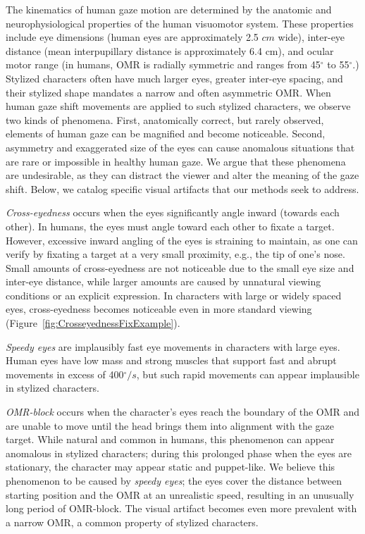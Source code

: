 The kinematics of human gaze motion are determined by the anatomic and neurophysiological properties of the human visuomotor system. These properties include eye dimensions (human eyes are approximately 2.5 $cm$ wide), inter-eye distance (mean interpupillary distance is approximately 6.4 cm), and ocular motor range (in humans, OMR is radially symmetric and ranges from 45$^\circ$ to 55$^\circ$.) Stylized characters often have much larger eyes, greater inter-eye spacing, and their stylized shape mandates a narrow and often asymmetric OMR. When human gaze shift movements are applied to such stylized characters, we observe two kinds of phenomena. First, anatomically correct, but rarely observed, elements of human gaze can be magnified and become noticeable. Second, asymmetry and exaggerated size of the eyes can cause anomalous situations that are rare or impossible in healthy human gaze. We argue that these phenomena are undesirable, as they can distract the viewer and alter the meaning of the gaze shift. Below, we catalog specific visual artifacts that our methods seek to address.

\emph{Cross-eyedness} occurs when the eyes significantly angle inward (towards each other). In humans, the eyes must angle toward each other to fixate a target. However, excessive inward angling of the eyes is straining to maintain, as one can verify by fixating a target at a very small proximity, e.g., the tip of one's nose. Small amounts of cross-eyedness are not noticeable due to the small eye size and inter-eye distance, while larger amounts are caused by unnatural viewing conditions or an explicit expression. In characters with large or widely spaced eyes, cross-eyedness becomes noticeable even in more standard viewing (Figure~\ref{fig:CrosseyednessFixExample}).

\emph{Speedy eyes} are implausibly fast eye movements in characters with large eyes. Human eyes have low mass and strong muscles that support fast and abrupt movements in excess of 400$^\circ/s$, but such rapid movements can appear implausible in stylized characters.

\emph{OMR-block} occurs when the character's eyes reach the boundary of the OMR and are unable to move until the head brings them into alignment with the gaze target. While natural and common in humans, this phenomenon can appear anomalous in stylized characters; during this prolonged phase when the eyes are stationary, the character may appear static and puppet-like. We believe this phenomenon to be caused by \textit{speedy eyes}; the eyes cover the distance between starting position and the OMR at an unrealistic speed, resulting in an unusually long period of OMR-block. The visual artifact becomes even more prevalent with a narrow OMR, a common property of stylized characters.

